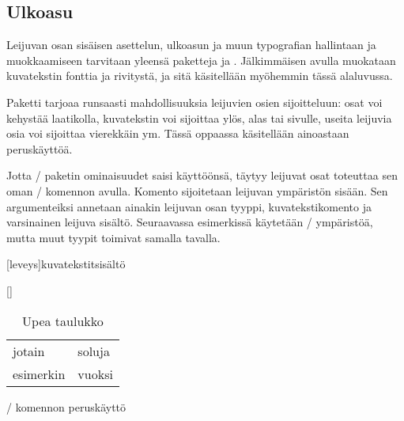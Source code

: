 \begin{koodilohkosis}
\usepackage[section]{placeins}
\end{koodilohkosis}

\subsection{Ulkoasu}
\label{luku/leijuosat-ulkoasu}

Leijuvan osan sisäisen asettelun, ulkoasun ja muun typografian
hallintaan ja muokkaamiseen tarvitaan yleensä paketteja
 ja
. Jälkimmäisen avulla muokataan
kuvatekstin fonttia ja rivitystä, ja sitä käsitellään myöhemmin tässä
alaluvussa.

Paketti  tarjoaa runsaasti mahdollisuuksia leijuvien
osien sijoitteluun: osat voi kehystää laatikolla, kuvatekstin voi
sijoittaa ylös, alas tai sivulle, useita leijuvia osia voi sijoittaa
vierekkäin ym. Tässä oppaassa käsitellään ainoastaan peruskäyttöä.

Jotta \-/ paketin ominaisuudet saisi käyttöönsä,
täytyy leijuvat osat toteuttaa sen oman \-/ komennon
avulla. Komento sijoitetaan leijuvan ympäristön sisään. Sen
argumenteiksi annetaan ainakin leijuvan osan tyyppi, kuvatekstikomento
ja varsinainen leijuva sisältö. Seuraavassa esimerkissä käytetään
\-/ ympäristöä, mutta muut tyypit toimivat samalla
tavalla.

\begin{koodilohkosis}
\begin{table}
  [leveys]{kuvatekstit}{sisältö}
\end{table}
\end{koodilohkosis}

\begin{esimerkki*}

\begin{koodilohko}
\begin{table}
  [\FBwidth]{
    \caption{Upea taulukko}    %
    \label{tlk/upea-taulukko}  %
  }{
    \begin{tabular}{ll}
      jotain & soluja \\
      esimerkin & vuoksi \\
    \end{tabular}
  } 
\end{table}
\end{koodilohko}
  \caption{\-/ komennon peruskäyttö}
  \label{esim/floatbox-perus}
\end{esimerkki*}

